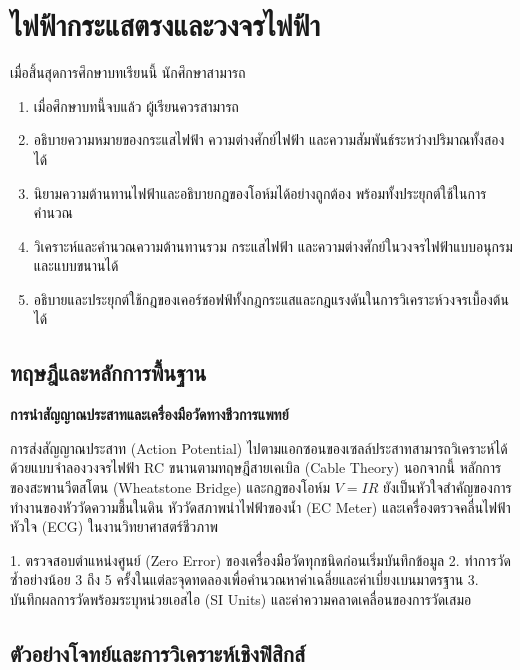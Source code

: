 \chapter{ไฟฟ้ากระแสตรงและวงจรไฟฟ้า}
\label{ch:ch12_current_electricity}

\begin{conceptbox}[title=วัตถุประสงค์การเรียนรู้ประจำบท]
เมื่อสิ้นสุดการศึกษาบทเรียนนี้ นักศึกษาสามารถ
\begin{enumerate}
    \item เมื่อศึกษาบทนี้จบแล้ว ผู้เรียนควรสามารถ
    \item อธิบายความหมายของกระแสไฟฟ้า ความต่างศักย์ไฟฟ้า และความสัมพันธ์ระหว่างปริมาณทั้งสองได้
    \item นิยามความต้านทานไฟฟ้าและอธิบายกฎของโอห์มได้อย่างถูกต้อง พร้อมทั้งประยุกต์ใช้ในการคำนวณ
    \item วิเคราะห์และคำนวณความต้านทานรวม กระแสไฟฟ้า และความต่างศักย์ในวงจรไฟฟ้าแบบอนุกรมและแบบขนานได้
    \item อธิบายและประยุกต์ใช้กฎของเคอร์ชอฟฟ์ทั้งกฎกระแสและกฎแรงดันในการวิเคราะห์วงจรเบื้องต้นได้
\end{enumerate}
\end{conceptbox}

\section{ทฤษฎีและหลักการพื้นฐาน}

\begin{bioappbox}
\textbf{การนำสัญญาณประสาทและเครื่องมือวัดทางชีวการแพทย์}

การส่งสัญญาณประสาท (Action Potential) ไปตามแอกซอนของเซลล์ประสาทสามารถวิเคราะห์ได้ด้วยแบบจำลองวงจรไฟฟ้า RC ขนานตามทฤษฎีสายเคเบิล (Cable Theory) นอกจากนี้ หลักการของสะพานวีตสโตน (Wheatstone Bridge) และกฎของโอห์ม $V = IR$ ยังเป็นหัวใจสำคัญของการทำงานของหัววัดความชื้นในดิน หัววัดสภาพนำไฟฟ้าของน้ำ (EC Meter) และเครื่องตรวจคลื่นไฟฟ้าหัวใจ (ECG) ในงานวิทยาศาสตร์ชีวภาพ
\end{bioappbox}

\begin{labbox}
1. ตรวจสอบตำแหน่งศูนย์ (Zero Error) ของเครื่องมือวัดทุกชนิดก่อนเริ่มบันทึกข้อมูล
2. ทำการวัดซ้ำอย่างน้อย 3 ถึง 5 ครั้งในแต่ละจุดทดลองเพื่อคำนวณหาค่าเฉลี่ยและค่าเบี่ยงเบนมาตรฐาน
3. บันทึกผลการวัดพร้อมระบุหน่วยเอสไอ (SI Units) และค่าความคลาดเคลื่อนของการวัดเสมอ
\end{labbox}

\section{ตัวอย่างโจทย์และการวิเคราะห์เชิงฟิสิกส์}


